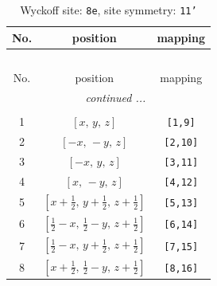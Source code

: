 \documentclass[fleqn,8pt]{jsarticle}
\begin{document}
\renewcommand{\arraystretch}{1.2}
\begin{longtable}{ccc}
\caption{Wyckoff site: {\tt 8e}, site symmetry: {\tt 11'}}
 \\
 \hline \hline
No. & position & mapping \\ \hline \endfirsthead

\multicolumn{2}{l}{\tablename\ \thetable{}} \\
 \hline \hline
No. & position & mapping \\ \hline \endhead

 \hline \hline
\multicolumn{2}{r}{\footnotesize\it continued ...} \\ \endfoot

 \hline \hline
\multicolumn{2}{r}{} \\ \endlastfoot

1 & $\left[ x,\, y,\, z \right]$ & {\tt [1,9]} \\ \hline
2 & $\left[ - x,\, - y,\, z \right]$ & {\tt [2,10]} \\ \hline
3 & $\left[ - x,\, y,\, z \right]$ & {\tt [3,11]} \\ \hline
4 & $\left[ x,\, - y,\, z \right]$ & {\tt [4,12]} \\ \hline
5 & $\left[ x + \frac{1}{2},\, y + \frac{1}{2},\, z + \frac{1}{2} \right]$ & {\tt [5,13]} \\ \hline
6 & $\left[ \frac{1}{2} - x,\, \frac{1}{2} - y,\, z + \frac{1}{2} \right]$ & {\tt [6,14]} \\ \hline
7 & $\left[ \frac{1}{2} - x,\, y + \frac{1}{2},\, z + \frac{1}{2} \right]$ & {\tt [7,15]} \\ \hline
8 & $\left[ x + \frac{1}{2},\, \frac{1}{2} - y,\, z + \frac{1}{2} \right]$ & {\tt [8,16]} \\
\end{longtable}
\end{document}
